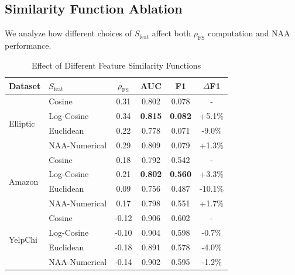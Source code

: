 \subsection{Similarity Function Ablation}

We analyze how different choices of $S_{\text{feat}}$ affect both $\rho_{\text{FS}}$ computation and NAA performance.

\begin{table}[t]
\centering
\caption{Effect of Different Feature Similarity Functions}
\label{tab:sfeat_ablation}
\small
\begin{tabular}{llcccc}
\toprule
\textbf{Dataset} & $S_{\text{feat}}$ & $\rho_{\text{FS}}$ & \textbf{AUC} & \textbf{F1} & $\Delta$F1 \\
\midrule
\multirow{4}{*}{Elliptic} & Cosine & 0.31 & 0.802 & 0.078 & - \\
& Log-Cosine & 0.34 & \textbf{0.815} & \textbf{0.082} & +5.1\% \\
& Euclidean & 0.22 & 0.778 & 0.071 & -9.0\% \\
& NAA-Numerical & 0.29 & 0.809 & 0.079 & +1.3\% \\
\midrule
\multirow{4}{*}{Amazon} & Cosine & 0.18 & 0.792 & 0.542 & - \\
& Log-Cosine & 0.21 & \textbf{0.802} & \textbf{0.560} & +3.3\% \\
& Euclidean & 0.09 & 0.756 & 0.487 & -10.1\% \\
& NAA-Numerical & 0.17 & 0.798 & 0.551 & +1.7\% \\
\midrule
\multirow{4}{*}{YelpChi} & Cosine & -0.12 & 0.906 & 0.602 & - \\
& Log-Cosine & -0.10 & 0.904 & 0.598 & -0.7\% \\
& Euclidean & -0.18 & 0.891 & 0.578 & -4.0\% \\
& NAA-Numerical & -0.14 & 0.902 & 0.595 & -1.2\% \\
\bottomrule
\end{tabular}
\end{table}

